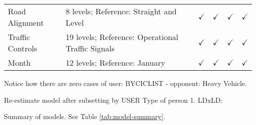 \documentclass[]{elsarticle} %
\begin{document}
\begin{table}[H]
{\begin{tabular}{llllll}
\rowcolor{gray!6}  \hspace{1em}Road Alignment & 8 levels; Reference: Straight and Level & $\checkmark$ & $\checkmark$ & $\checkmark$ & $\checkmark$\\
\hspace{1em}Traffic Controls & 19 levels; Reference: Operational Traffic Signals & $\checkmark$ & $\checkmark$ & $\checkmark$ & $\checkmark$\\
\rowcolor{gray!6}  \hspace{1em}Month & 12 levels; Reference: January & $\checkmark$ & $\checkmark$ & $\checkmark$ & $\checkmark$\\
\bottomrule
\end{tabular}}
\end{table}

Notice how there are zero cases of user: BYCICLIST - opponent: Heavy
Vehicle.

Re-estimate model after subsetting by USER Type of person 1. LDxLD:

Summary of models. See Table \ref{tab:model-summary}.
\end{document}
